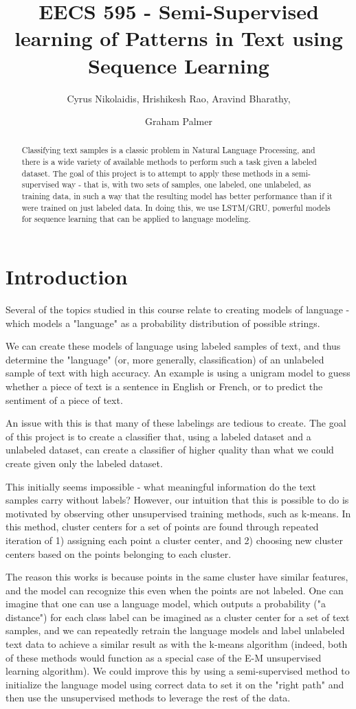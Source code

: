 \documentclass[11pt,letterpaper]{article}
\title{EECS 595 - Semi-Supervised learning of Patterns in Text using Sequence Learning}
\author{Cyrus Nikolaidis, Hrishikesh Rao, Aravind Bharathy,\and Graham Palmer}
\date{}
\begin{document}
\maketitle

\begin{abstract}
 Classifying text samples is a classic problem in Natural Language Processing, and there is a wide variety of available methods to perform such a task given a labeled dataset. The goal of this project is to attempt to apply these methods in a semi-supervised way - that is, with two sets of samples, one labeled, one unlabeled, as training data, in such a way that the resulting model has better performance than if it were trained on just labeled data. In doing this, we use LSTM/GRU, powerful models for sequence learning that can be applied to language modeling.
\end{abstract}

\section{Introduction}

Several of the topics studied in this course relate to creating models of language - which models a "language" as a probability distribution of possible strings.

We can create these models of language using labeled samples of text, and thus determine the "language" (or, more generally, classification) of an unlabeled sample of text with high accuracy. An example is using a unigram model to guess whether a piece of text is a sentence in English or French, or to predict the sentiment of a piece of text.

An issue with this is that many of these labelings are tedious to create. The goal of this project is to create a classifier that, using a labeled dataset and a unlabeled dataset, can create a classifier of higher quality than what we could create given only the labeled dataset.

This initially seems impossible - what meaningful information do the text samples carry without labels? However, our intuition that this is possible to do is motivated by observing other unsupervised training methods, such as k-means. In this method, cluster centers for a set of points are found through repeated iteration of 1) assigning each point a cluster center, and 2) choosing new cluster centers based on the points belonging to each cluster. 

The reason this works is because points in the same cluster have similar features, and the model can recognize this even when the points are not labeled. One can imagine that one can use a language model, which outputs a probability ("a distance") for each class label can be imagined as a cluster center for a set of text samples, and we can repeatedly retrain the language models and label unlabeled text data to achieve a similar result as with the k-means algorithm (indeed, both of these methods would function as a special case of the E-M unsupervised learning algorithm). We could improve this by using a semi-supervised method to initialize the language model using correct data to set it on the "right path" and then use the unsupervised methods to leverage the rest of the data.
\end{document}
